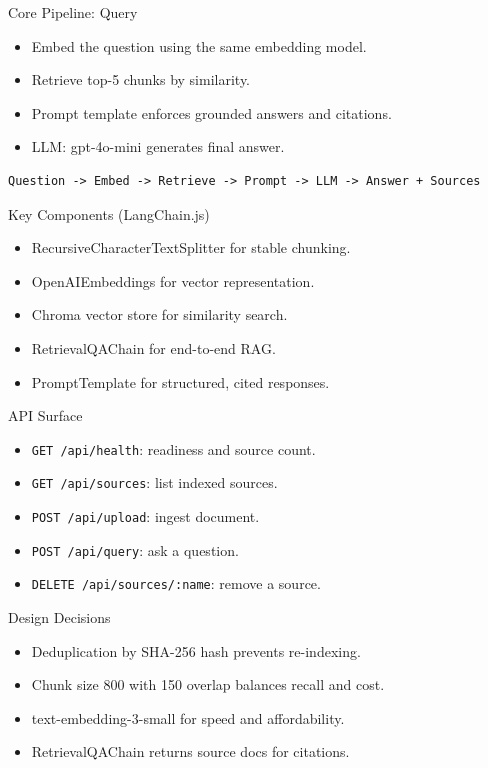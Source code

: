 \documentclass[aspectratio=169]{beamer}
\begin{document}
\begin{frame}{Core Pipeline: Query}
  \begin{itemize}
    \item Embed the question using the same embedding model.
    \item Retrieve top-5 chunks by similarity.
    \item Prompt template enforces grounded answers and citations.
    \item LLM: gpt-4o-mini generates final answer.
  \end{itemize}
  \vspace{4pt}
  \small
  \begin{verbatim}
Question -> Embed -> Retrieve -> Prompt -> LLM -> Answer + Sources
  \end{verbatim}
\end{frame}

\begin{frame}{Key Components (LangChain.js)}
  \begin{itemize}
    \item RecursiveCharacterTextSplitter for stable chunking.
    \item OpenAIEmbeddings for vector representation.
    \item Chroma vector store for similarity search.
    \item RetrievalQAChain for end-to-end RAG.
    \item PromptTemplate for structured, cited responses.
  \end{itemize}
\end{frame}

\begin{frame}{API Surface}
  \begin{itemize}
    \item \texttt{GET /api/health}: readiness and source count.
    \item \texttt{GET /api/sources}: list indexed sources.
    \item \texttt{POST /api/upload}: ingest document.
    \item \texttt{POST /api/query}: ask a question.
    \item \texttt{DELETE /api/sources/:name}: remove a source.
  \end{itemize}
\end{frame}

\begin{frame}{Design Decisions}
  \begin{itemize}
    \item Deduplication by SHA-256 hash prevents re-indexing.
    \item Chunk size 800 with 150 overlap balances recall and cost.
    \item text-embedding-3-small for speed and affordability.
    \item RetrievalQAChain returns source docs for citations.
  \end{itemize}
\end{frame}
\end{document}
